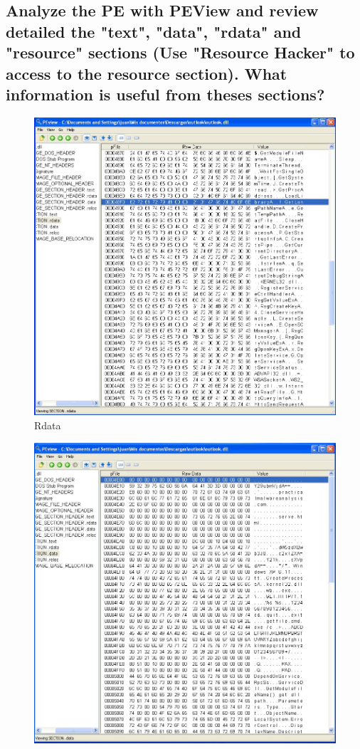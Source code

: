 \documentclass[12pt,letter]{article} %
\begin{document}
        \subsection{Analyze the PE with PEView and review detailed the "text",
        "data", "rdata" and "resource" sections (Use "Resource Hacker" to
        access to the resource section). What information is useful from theses
        sections?}\pagebreak
		\begin{figure}[h!]
			\centering
			\includegraphics[scale=0.28]{img1.jpeg}
			\caption{Rdata}
			\label{libraries}
		\end{figure}
		\begin{figure}[h!]
			\centering
			\includegraphics[scale=0.28]{img2.jpeg}
		\end{figure}
\end{document}

